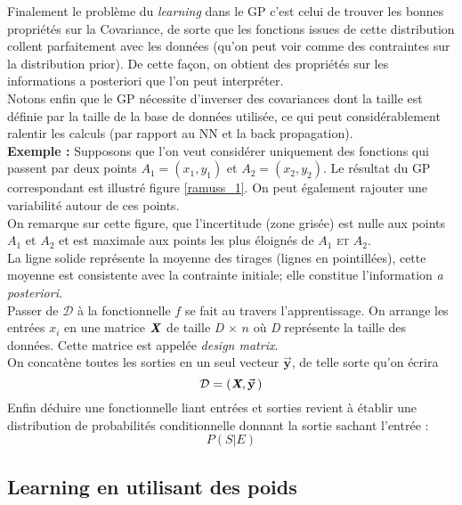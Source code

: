 \documentclass[a4paper,12pt]{report}
\newcommand{\bepar}[1]{
	\left( #1 \right)  
}
\newcommand\bk{\color{black}}
\newcommand\brick{\color{brick}}
\newcommand{\dgreen}{\color{dgreen}}
\numberwithin{equation}{section} %
\begin{document}
Finalement le problème du \textit{learning} dans le GP c'est celui de trouver les bonnes propriétés sur la Covariance, de sorte que les fonctions issues de cette distribution collent parfaitement avec les données (qu'on peut voir comme des contraintes sur la distribution prior). De cette façon, on obtient des propriétés sur les informations a posteriori que l'on peut interpréter. \\ Notons enfin que le GP nécessite d'inverser des covariances dont la taille est définie par la taille de la base de données utilisée, ce qui peut considérablement ralentir les calculs (par rapport au NN et la back propagation). \\[3mm]

\dgreen \textbf{\large{Exemple :}} \bk Supposons que l'on veut considérer uniquement des fonctions qui passent par deux points $A_1 = \left( x_1, y_1 \right)$ et $A_2 = \left( x_2, y_2\right)$. Le résultat du GP correspondant est illustré figure \eqref{ramuss_1}. On peut également rajouter une variabilité autour de ces points.\\
On remarque sur cette figure, que l'incertitude (zone grisée) est nulle aux points $A_1$ et $A_2$ et est maximale aux points les plus éloignés de $A_1$ \textsc{et} $A_2$.\\
La ligne solide représente la moyenne des tirages (lignes en pointillées), cette moyenne est consistente avec la contrainte initiale; elle constitue l'information \textit{a posteriori}.\\


\noindent Passer de $\mathcal{D}$ à la fonctionnelle $f$ se fait au travers l'apprentissage. On arrange les entrées $x_i$ en une matrice $\textbf{\textit{X}}$ de taille \textit{D}$\, \times \,n$ où \textit{D} représente la taille des données. Cette matrice est appelée \textit{design matrix}.\\
On concatène toutes les sorties en un seul vecteur $\vec{\textbf{y}}$, de telle sorte qu'on écrira 
\begin{equation}
\mathcal{D} = \bepar{\textit{\textbf{X}}, \vec{\textbf{y}}\,}
\end{equation}
Enfin déduire une fonctionnelle liant entrées et sorties revient à établir une distribution de probabilités conditionnelle donnant la sortie sachant l'entrée :
\begin{equation}
P \bepar{S | E}
\end{equation}

\brick \subsection{Learning en utilisant des poids} \bk
\end{document}
